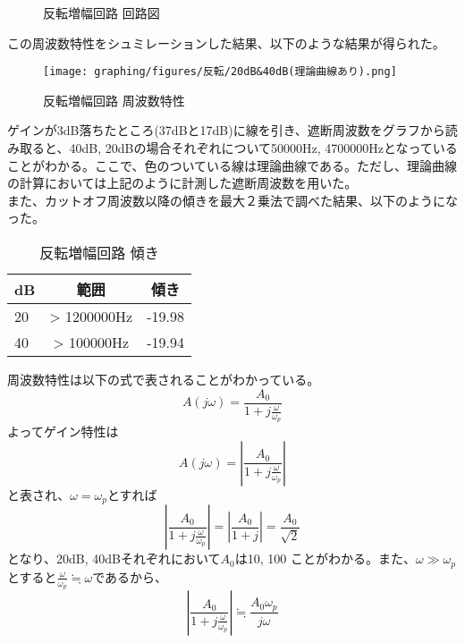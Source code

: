 \documentclass{ltjsarticle}
\begin{document}
\begin{figure}[H]
\begin{center}
        \caption{反転増幅回路 回路図}
    \end{center}
\end{figure}

この周波数特性をシュミレーションした結果、以下のような結果が得られた。

\begin{figure}[H]
    \begin{center}
        \texttt{[image: graphing/figures/反転/20dB\&40dB(理論曲線あり).png]}
        \caption{反転増幅回路 周波数特性}
    \end{center}
\end{figure}

ゲインが3dB落ちたところ(37dBと17dB)に線を引き、遮断周波数をグラフから読み取ると、40dB, 20dBの場合それぞれについて50000Hz, 4700000Hzとなっていることがわかる。ここで、色のついている線は理論曲線である。ただし、理論曲線の計算においては上記のように計測した遮断周波数を用いた。\\

また、カットオフ周波数以降の傾きを最大２乗法で調べた結果、以下のようになった。

\begin{table}[H]
    \begin{center}
        \begin{tabular}{|l|c|c|} \hline
            dB & 範囲 & 傾き \\ \hline
            20 & > 1200000Hz & -19.98 \\ \hline
            40 & > 100000Hz & -19.94 \\ \hline
        \end{tabular}
        \caption{反転増幅回路 傾き}
    \end{center}
\end{table}

周波数特性は以下の式で表されることがわかっている。
$$
A(j\omega) = \frac{A_0}{1+j\frac{\omega}{\omega_p}}
$$
よってゲイン特性は
$$
A(j\omega) = \left|\frac{A_0}{1+j\frac{\omega}{\omega_p}}\right|
$$
と表され、$\omega=\omega_p$とすれば
$$
\left|\frac{A_0}{1+j\frac{\omega}{\omega_p}}\right| = \left|\frac{A_0}{1+j}\right| = \frac{A_0}{\sqrt{2}}
$$
となり、20dB, 40dBそれぞれにおいて$A_0$は10, 100
ことがわかる。また、$\omega \gg \omega_p$とすると$\frac{\omega}{\omega_p} \fallingdotseq \omega$であるから、
$$
\left|\frac{A_0}{1+j\frac{\omega}{\omega_p}}\right| \fallingdotseq \frac{A_0\omega_p}{j\omega}
$$
\end{document}
